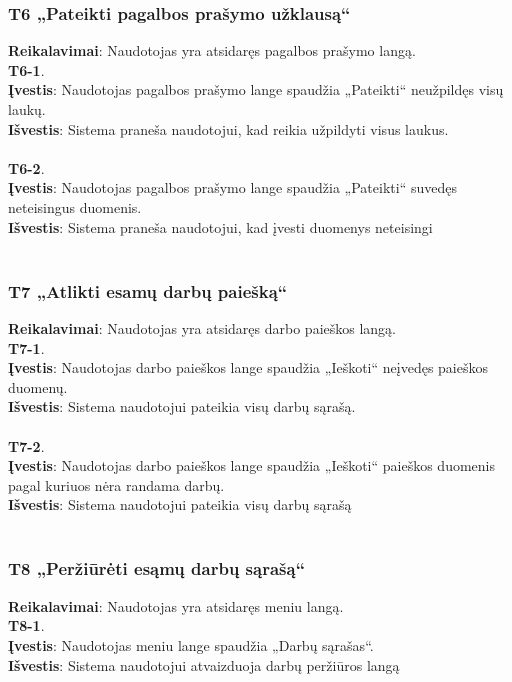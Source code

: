 \documentclass{VUMIFPSbakalaurinis}
\begin{document}
\subsubsection{T6 „Pateikti pagalbos prašymo užklausą“}
\textbf{Reikalavimai}: Naudotojas yra atsidaręs pagalbos prašymo langą. \\
\textbf{T6-1}. \\
\textbf{Įvestis}: Naudotojas pagalbos prašymo lange spaudžia „Pateikti“ neužpildęs visų laukų. \\
\textbf{Išvestis}: Sistema praneša naudotojui, kad reikia užpildyti visus laukus. \\ \\
\textbf{T6-2}. \\
\textbf{Įvestis}: Naudotojas pagalbos prašymo lange spaudžia „Pateikti“ suvedęs neteisingus duomenis. \\
\textbf{Išvestis}: Sistema praneša naudotojui, kad įvesti duomenys neteisingi\\ \\

\subsubsection{T7 „Atlikti esamų darbų paiešką“}
\textbf{Reikalavimai}: Naudotojas yra atsidaręs darbo paieškos langą. \\
\textbf{T7-1}. \\
\textbf{Įvestis}: Naudotojas darbo paieškos lange spaudžia „Ieškoti“ neįvedęs paieškos duomenų. \\
\textbf{Išvestis}: Sistema naudotojui pateikia visų darbų sąrašą. \\ \\
\textbf{T7-2}. \\
\textbf{Įvestis}: Naudotojas darbo paieškos lange spaudžia „Ieškoti“ paieškos duomenis pagal kuriuos nėra randama darbų. \\
\textbf{Išvestis}: Sistema naudotojui pateikia visų darbų sąrašą\\ \\

\subsubsection{T8 „Peržiūrėti esąmų darbų sąrašą“}
\textbf{Reikalavimai}: Naudotojas yra atsidaręs meniu langą. \\
\textbf{T8-1}. \\
\textbf{Įvestis}: Naudotojas meniu lange spaudžia „Darbų sąrašas“. \\
\textbf{Išvestis}: Sistema naudotojui atvaizduoja darbų peržiūros langą \\ \\
\end{document}
